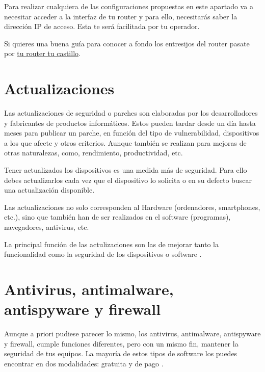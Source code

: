 \documentclass[
  spanish,
  a4paper,
  openany]{book}
\begin{document}
Para realizar cualquiera de las configuraciones propuestas en este apartado va a necesitar acceder a la interfaz de tu router y para ello, necesitarás saber la dirección IP de acceso. Esta te será facilitada por tu operador.

Si quieres una buena guía para conocer a fondo los entresijos del router pasate por \href{https://www.osi.es/sites/default/files/docs/guia_router/osi-guia-tu-router-tu-castillo.pdf}{tu router tu castillo}.

\hypertarget{actualizaciones}{%
\section{Actualizaciones}\label{actualizaciones}}

Las actualizaciones de seguridad o parches son elaboradas por los desarrolladores y fabricantes de productos informáticos. Estos pueden tardar desde un día hasta meses para publicar un parche, en función del tipo de vulnerabilidad, dispositivos a los que afecte y otros criterios. Aunque también se realizan para mejoras de otras naturalezas, como, rendimiento, productividad, etc.

Tener actualizados los dispositivos es una medida más de seguridad. Para ello debes actualizarlos cada vez que el dispositivo lo solicita o en su defecto buscar una actualización disponible.

Las actualizaciones no solo corresponden al Hardware (ordenadores, smartphones, etc.), sino que también han de ser realizados en el software (programas), navegadores, antivirus, etc.

La principal función de las actulizaciones son las de mejorar tanto la funcionalidad como la seguridad de los dispositivos o software \citep{OSI-actualizaciones}.

\hypertarget{antivirus-antimalware-antispyware-y-firewall}{%
\section{Antivirus, antimalware, antispyware y firewall}\label{antivirus-antimalware-antispyware-y-firewall}}

Aunque a priori pudiese parecer lo mismo, los antivirus, antimalware, antispyware y firewall, cumple funciones diferentes, pero con un mismo fin, mantener la seguridad de tus equipos. La mayoría de estos tipos de software los puedes encontrar en dos modalidades: gratuita y de pago \citep{software-seguridad}.
\end{document}
